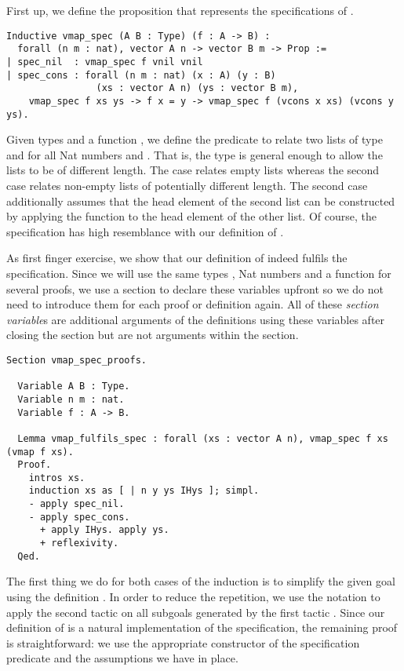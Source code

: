 First up, we define the proposition  that represents the specifications of .

\begin{verbatim}
Inductive vmap_spec (A B : Type) (f : A -> B) :
  forall (n m : nat), vector A n -> vector B m -> Prop :=
| spec_nil  : vmap_spec f vnil vnil
| spec_cons : forall (n m : nat) (x : A) (y : B)
                (xs : vector A n) (ys : vector B m),
    vmap_spec f xs ys -> f x = y -> vmap_spec f (vcons x xs) (vcons y ys).
\end{verbatim}

Given types  and a function , we define the predicate to relate two lists of type  and  for all Nat numbers  and .
That is, the type is general enough to allow the lists to be of different length.
The  case relates empty lists whereas the second case  relates non-empty lists of potentially different length.
The second case additionally assumes that the head element of the second list  can be constructed by applying the function to the head element  of the other list.
Of course, the specification has high resemblance with our definition of .

As first finger exercise, we show that our definition of  indeed fulfils the specification.
Since we will use the same types , Nat numbers  and a function  for several proofs, we use a section to declare these variables upfront so we do not need to introduce them for each proof or definition again.
All of these \emph{section variable}s are additional arguments of the definitions using these variables after closing the section but are not arguments within the section.

\begin{verbatim}
Section vmap_spec_proofs.

  Variable A B : Type.
  Variable n m : nat.
  Variable f : A -> B.

  Lemma vmap_fulfils_spec : forall (xs : vector A n), vmap_spec f xs (vmap f xs).
  Proof.
    intros xs.
    induction xs as [ | n y ys IHys ]; simpl.
    - apply spec_nil.
    - apply spec_cons.
      + apply IHys. apply ys.
      + reflexivity.
  Qed.
\end{verbatim}

The first thing we do for both cases of the induction is to simplify the given goal using the definition .
In order to reduce the repetition, we use the notation  to apply the second tactic  on all subgoals generated by the first tactic .
Since our definition of  is a natural implementation of the specification, the remaining proof is straightforward: we use the appropriate constructor of the specification predicate and the assumptions we have in place.

